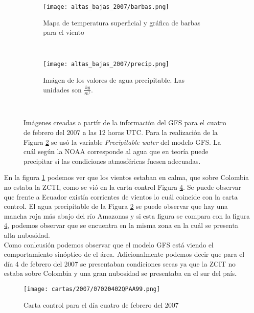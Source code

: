\begin{figure}[H]
	\begin{center}
		\begin{subfigure}[normla]{0.4\textwidth}
	\texttt{[image: altas\_bajas\_2007/barbas.png]}
		\caption{Mapa de temperatura superficial y gráfica de barbas para el viento}
		\label{gra_barbas}
		\end{subfigure}
		~
				\begin{subfigure}[normla]{0.4\textwidth}
	\texttt{[image: altas\_bajas\_2007/precip.png]}
		\caption{Imágen de los valores de agua precipitable. Las unidades son $\frac{kg}{m^2}$.}
		\label{gra_agua_precip}
		\end{subfigure}
		~
			\end{center}
	\caption{Imágenes creadas a partír de la información del GFS para el cuatro de febrero del 2007 a las 12 horas UTC. Para la realización de la Figura \ref{gra_agua_precip} se usó la variable \textit{Precipitable water} del modelo GFS. La cuál según la NOAA corresponde al agua que en teoría puede precipitar si las condiciones atmosféricas fuesen adecuadas.}
	\label{gra:taylor_totaltotal}	
\end{figure}

En la figura \ref{gra_barbas} podemos ver que los vientos estaban en calma, que sobre Colombia no estaba la ZCTI, como se vió en la carta control Figura \ref{fig:carta4}. Se puede observar que frente a Ecuador existía corrientes de vientos lo cuál coincide con la carta control. El agua precipitable de la Figura \ref{gra_agua_precip} se puede observar que hay una mancha roja más abajo del río Amazonas y si esta figura se compara con la figura \ref{fig:carta4}, podemos observar que se encuentra en la misma zona en la cuál se presenta alta nubosidad.\\


Como conlcusión podemos observar que el modelo GFS está viendo el comportamiento sinóptico de el área. Adicionalmente podemos decir que para el día 4 de febrero del 2007 se presentaban condiciones secas ya que la ZCIT no estaba sobre Colombia y una gran nubosidad se presentaba en el sur del país.




\begin{figure}[H]
    \centering
    \texttt{[image: cartas/2007/07020402QPAA99.png]}
    \caption{Carta control para el día cuatro de febrero del 2007}
    \label{fig:carta4}
\end{figure}
 
